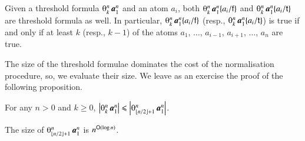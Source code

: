 \begin{remark}\label{remark:ThersholdSubstitution}
Given a threshold formula $\th kn\avec1n$ and an atom $a_i$, both $\th kn\avec1n\{a_i/\fff\}$ and $\th kn\avec 1n\{a_i/\ttt\}$ are threshold formula as well. In particular, $\th kn\avec1n\{a_i/\fff\}$ (resp., $\th kn\avec 1n\{a_i/\ttt\}$) is true if and only if at least $k$ (resp., $k-1$) of the atoms $a_1$, $\dots$, $a_{i-1}$, $a_{i+1}$, $\dots$, $a_n$ are true.
\end{remark}

The size of the threshold formulae dominates the cost of the normalisation procedure, so, we evaluate their size. We leave as an exercise the proof of the following proposition.

\begin{proposition}\label{proposition:LargestThresholdFormula}
For any $n>0$ and $k\ge0$, $\size{\th kn\avec1n}\le\size{\th{\lfloor n/2\rfloor+1}n\avec1n}$.
\end{proposition}

\begin{lemma}\label{lemma:SizeThresholdMax}
The size of\/ $\th{\lfloor n/2\rfloor+1}n\avec1n$ is $n^{{\mathsf O}(\log n)}$.
\end{lemma}

